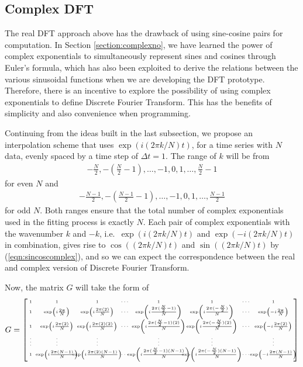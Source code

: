 \subsection{Complex DFT}

The real DFT approach above has the drawback of using sine-cosine pairs for computation. In Section \ref{section:complexno}, we have learned the power of complex exponentials to simultaneously represent sines and cosines through Euler's formula, which has also been exploited to derive the relations between the various sinusoidal functions when we are developing the DFT prototype. Therefore, there is an incentive to explore the possibility of using complex exponentials to define Discrete Fourier Transform. This has the benefits of simplicity and also convenience when programming.

Continuing from the ideas built in the last subsection, we propose an interpolation scheme that uses $\exp(i (2\pi k/N) t)$, for a time series with $N$ data, evenly spaced by a time step of $\Delta t = 1$. The range of $k$ will be from 
\begin{align*}
-\frac{N}{2}, -\left(\frac{N}{2}-1\right), \ldots, -1, \allowbreak 0, 1, \ldots, \frac{N}{2}-1  
\end{align*}for even $N$ and
\begin{align*}
-\frac{N-1}{2}, -\left(\frac{N-1}{2}-1\right), \dots, -1, 0, 1, \ldots, \frac{N-1}{2} 
\end{align*} for odd $N$. Both ranges ensure that the total number of complex exponentials used in the fitting process is exactly $N$. Each pair of complex exponentials with the wavenumber $k$ and $-k$, i.e.\ $\exp(i (2\pi k/N) t)$ and $\exp(-i (2\pi k/N) t)$ in combination, gives rise to $\cos( (2\pi k/N) t)$ and $\sin((2\pi k/N) t)$ by (\ref{eqn:sincoscomplex}), and so we can expect the correspondence between the real and complex version of Discrete Fourier Transform.\par
Now, the matrix $G$ will take the form of
\begin{align}
G = \tiny
\renewcommand\arraystretch{1.33}
\left[\begin{array}{@{\,}wc{5pt}wc{40pt}wc{40pt}wc{8pt}wc{56pt}wc{56pt}wc{8pt}wc{40pt}}
1 & 1 & 1 & \cdots & 1 & 1 & \cdots & 1\\
1 & \exp(i\frac{2\pi}{N}) & \exp(i\frac{2\pi(2)}{N}) & \cdots & \exp(i\frac{2\pi(\frac{N}{2}-1)}{N}) & \exp(i\frac{2\pi(-\frac{N}{2})}{N}) & \cdots & \exp(-i\frac{2\pi}{N}) \\
1 & \exp(i\frac{2\pi(2)}{N}) & \exp(i\frac{2\pi(2)(2)}{N}) & \cdots & \exp(i\frac{2\pi(\frac{N}{2}-1)(2)}{N}) & \exp(i\frac{2\pi(-\frac{N}{2})(2)}{N}) & \cdots & \exp(-i\frac{2\pi(2)}{N})\\
\vdots & \vdots & \vdots &  & \vdots & \vdots &  & \vdots \\
1 & \exp(i\frac{2\pi(N-1)}{N}) & \exp(i\frac{2\pi(2)(N-1)}{N}) & \cdots & \exp(i\frac{2\pi(\frac{N}{2}-1)(N-1)}{N}) & \exp(i\frac{2\pi(-\frac{N}{2})(N-1)}{N}) & \cdots & \exp(-i\frac{2\pi(N-1)}{N}) \\
\end{array}\right]
\end{align}
